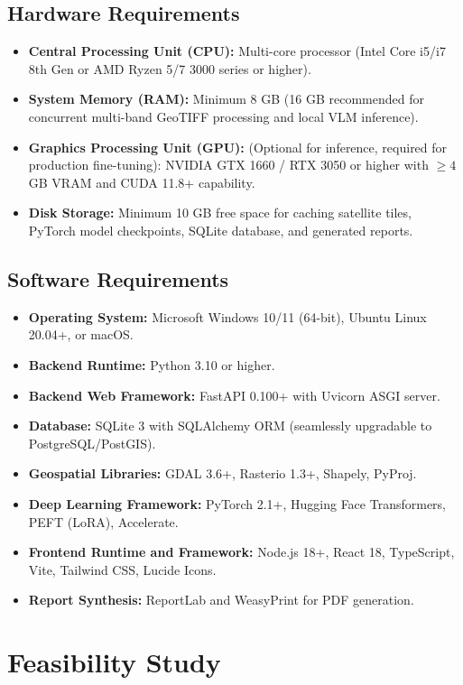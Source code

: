 \documentclass[12pt,a4paper]{report}
\begin{document}
\subsection{Hardware Requirements}
\begin{itemize}
    \item \textbf{Central Processing Unit (CPU):} Multi-core processor (Intel Core i5/i7 8th Gen or AMD Ryzen 5/7 3000 series or higher).
    \item \textbf{System Memory (RAM):} Minimum 8 GB (16 GB recommended for concurrent multi-band GeoTIFF processing and local VLM inference).
    \item \textbf{Graphics Processing Unit (GPU):} (Optional for inference, required for production fine-tuning): NVIDIA GTX 1660 / RTX 3050 or higher with $\ge 4$ GB VRAM and CUDA 11.8+ capability.
    \item \textbf{Disk Storage:} Minimum 10 GB free space for caching satellite tiles, PyTorch model checkpoints, SQLite database, and generated reports.
\end{itemize}

\subsection{Software Requirements}
\begin{itemize}
    \item \textbf{Operating System:} Microsoft Windows 10/11 (64-bit), Ubuntu Linux 20.04+, or macOS.
    \item \textbf{Backend Runtime:} Python 3.10 or higher.
    \item \textbf{Backend Web Framework:} FastAPI 0.100+ with Uvicorn ASGI server.
    \item \textbf{Database:} SQLite 3 with SQLAlchemy ORM (seamlessly upgradable to PostgreSQL/PostGIS).
    \item \textbf{Geospatial Libraries:} GDAL 3.6+, Rasterio 1.3+, Shapely, PyProj.
    \item \textbf{Deep Learning Framework:} PyTorch 2.1+, Hugging Face Transformers, PEFT (LoRA), Accelerate.
    \item \textbf{Frontend Runtime and Framework:} Node.js 18+, React 18, TypeScript, Vite, Tailwind CSS, Lucide Icons.
    \item \textbf{Report Synthesis:} ReportLab and WeasyPrint for PDF generation.
\end{itemize}

\section{Feasibility Study}
\end{document}
